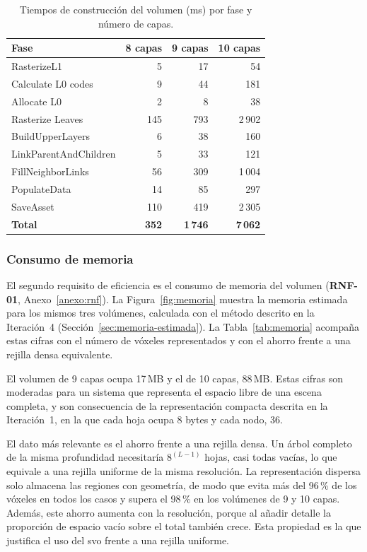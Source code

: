\begin{table}[htp]
  \centering
  \begin{tabular}{l|r|r|r}
  \rowcolor{udcpink!25}
  \textbf{Fase} & \textbf{8 capas} & \textbf{9 capas} & \textbf{10 capas} \\\hline
  RasterizeL1 & 5 & 17 & 54 \\
  Calculate L0 codes & 9 & 44 & 181 \\
  Allocate L0 & 2 & 8 & 38 \\
  Rasterize Leaves & 145 & 793 & 2\,902 \\
  BuildUpperLayers & 6 & 38 & 160 \\
  LinkParentAndChildren & 5 & 33 & 121 \\
  FillNeighborLinks & 56 & 309 & 1\,004 \\
  PopulateData & 14 & 85 & 297 \\
  SaveAsset & 110 & 419 & 2\,305 \\\hline
  \textbf{Total} & \textbf{352} & \textbf{1\,746} & \textbf{7\,062} \\
  \end{tabular}
  \caption{Tiempos de construcción del volumen (ms) por fase y número de capas.}
  \label{tab:bake-times}
\end{table}

\subsubsection{Consumo de memoria}

El segundo requisito de eficiencia es el consumo de memoria del volumen (\textbf{RNF-01}, Anexo~\ref{anexo:rnf}).
La Figura~\ref{fig:memoria} muestra la memoria estimada para los mismos tres volúmenes, calculada con el método descrito en la Iteración~4 (Sección~\ref{sec:memoria-estimada}).
La Tabla~\ref{tab:memoria} acompaña estas cifras con el número de vóxeles representados y con el ahorro frente a una rejilla densa equivalente.

El volumen de 9 capas ocupa 17\,MB y el de 10 capas, 88\,MB.
Estas cifras son moderadas para un sistema que representa el espacio libre de una escena completa, y son consecuencia de la representación compacta descrita en la Iteración~1, en la que cada hoja ocupa 8 bytes y cada nodo, 36.

El dato más relevante es el ahorro frente a una rejilla densa.
Un árbol completo de la misma profundidad necesitaría $8^{(L-1)}$ hojas, casi todas vacías, lo que equivale a una rejilla uniforme de la misma resolución.
La representación dispersa solo almacena las regiones con geometría, de modo que evita más del 96\,\% de los vóxeles en todos los casos y supera el 98\,\% en los volúmenes de 9 y 10 capas.
Además, este ahorro aumenta con la resolución, porque al añadir detalle la proporción de espacio vacío sobre el total también crece.
Esta propiedad es la que justifica el uso del \acrshort{svo} frente a una rejilla uniforme.

